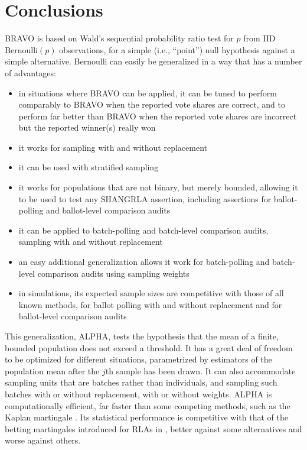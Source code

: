 \documentclass[12pt,runningheads]{llncs}
\newcommand{\Bern}{\ensuremath{\mathrm{Bernoulli}}}
\begin{document}
{\section{Conclusions}
BRAVO is based on Wald's sequential probability ratio test for $p$ from IID $\Bern(p)$ observations, for a simple (i.e., ``point'') null hypothesis against a simple alternative.
Bernoulli can easily be generalized in a way that has a number of advantages:
\begin{itemize}
   \item in situations where BRAVO can be applied, it can be tuned to perform comparably to BRAVO when the reported vote shares are correct, 
             and to perform far better than BRAVO when the reported vote shares are incorrect but the reported winner(s) really won
   \item it works for sampling with and without replacement
   \item it can be used with stratified sampling
   \item it works for populations that are not binary, but merely bounded, allowing it to be used to test any SHANGRLA assertion,
            including assertions for ballot-polling and ballot-level comparison audits
   \item it can be applied to batch-polling and batch-level comparison audits, sampling with and without replacement
   \item an easy additional generalization allows it work for batch-polling and batch-level comparison audits using sampling weights
   \item in simulations, its expected sample sizes are competitive with those of all known methods, for ballot polling with and without replacement and 
            for ballot-level comparison audits
   \end{itemize}
This generalization, ALPHA, tests the hypothesis that the mean of a finite, bounded population does not exceed a threshold.
It has a great deal of freedom to be optimized for different situations, parametrized by
estimators of the population mean after the $j$th sample has been drawn.
It can also accommodate sampling units that are batches rather than individuals, and sampling such batches
with or without replacement, with or without weights.
ALPHA is computationally efficient, far faster than some competing methods, such as the Kaplan martingale \cite{starkEvans19,stark20}.
Its statistical performance is competitive with that of the betting martingales introduced for RLAs in \cite{waudby-smithEtal21},
better against some alternatives and worse against others.
}
\end{document}
